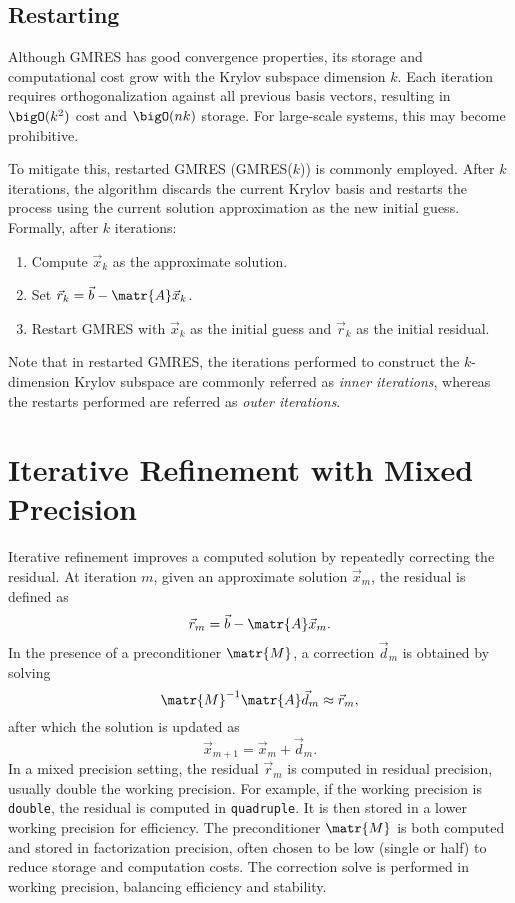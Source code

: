 \subsection{Restarting}
\label{sec:restarting}

Although GMRES has good convergence properties, its storage and computational
cost grow with the Krylov subspace dimension \(k\). Each iteration requires
orthogonalization against all previous basis vectors, resulting in
\(\bigO(k^2)\) cost and \(\bigO(nk)\) storage. For large-scale systems, this
may become prohibitive.

To mitigate this, restarted GMRES (GMRES(\(k\))) is commonly employed. After
\(k\) iterations, the algorithm discards the current Krylov basis and restarts
the process using the current solution approximation as the new initial guess.
Formally, after \(k\) iterations:
\begin{enumerate}
\item Compute \(\vec{x}_k\) as the approximate solution.
\item \label{item:nonlin-update} Set \(\vec{r}_k = \vec{b} - \matr{A} \vec{x}_k\).
\item Restart GMRES with \(\vec{x}_k\) as the initial guess and \(\vec{r}_k\) as the initial
  residual.
\end{enumerate}

Note that in restarted GMRES, the iterations performed to construct the
\(k\)-dimension Krylov subspace are commonly referred as \emph{inner iterations},
whereas the restarts performed are referred as \emph{outer iterations}.

\section{Iterative Refinement with Mixed Precision}
\label{sec:iter-refin-with}

Iterative refinement improves a computed solution by repeatedly correcting the
residual. At iteration \(m\), given an approximate solution \(\vec{x}_m\), the
residual is defined as
\begin{equation}
  \label{eq:ir-res}
  \vec{r}_m = \vec{b} - \matr{A} \vec{x}_m.
\end{equation}
In the presence of a preconditioner \(\matr{M}\), a correction \(\vec{d}_m\) is
obtained by solving \[\matr{M}^{-1}\matr{A} \vec{d}_m \approx \vec{r}_m,\] after
which the solution is updated as
\begin{equation}
  \label{eq:ir-update}
  \vec{x}_{m+1} = \vec{x}_m + \vec{d}_m.
\end{equation}
In a mixed precision setting, the residual \(\vec{r}_m\) is computed in residual
precision, usually double the working precision. For example, if the working
precision is \texttt{double}, the residual is computed in \texttt{quadruple}. It
is then stored in a lower working precision for efficiency. The preconditioner
\(\matr{M}\) is both computed and stored in factorization precision, often
chosen to be low (single or half) to reduce storage and computation costs. The
correction solve is performed in working precision, balancing efficiency and
stability.

